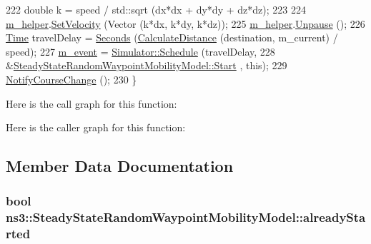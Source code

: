 \begin{DoxyCode}
222   \textcolor{keywordtype}{double} k = speed / std::sqrt (dx*dx + dy*dy + dz*dz);
223 
224   \hyperlink{classns3_1_1SteadyStateRandomWaypointMobilityModel_ac32e974711c22cb50358e4e10109516c}{m\_helper}.\hyperlink{classns3_1_1ConstantVelocityHelper_a985ce86c5b3c94c43048f8db314bbb51}{SetVelocity} (Vector (k*dx, k*dy, k*dz));
225   \hyperlink{classns3_1_1SteadyStateRandomWaypointMobilityModel_ac32e974711c22cb50358e4e10109516c}{m\_helper}.\hyperlink{classns3_1_1ConstantVelocityHelper_a053e3968696019359f50d2b2739f783a}{Unpause} ();
226   \hyperlink{namespacens3_1_1TracedValueCallback_a7ffd3e7c142ffe7c8a1d2db9b8de38ec}{Time} travelDelay = \hyperlink{group__timecivil_ga33c34b816f8ff6628e33d5c8e9713b9e}{Seconds} (\hyperlink{namespacens3_aaae60adf695e280c4882ced6041d1628}{CalculateDistance} (destination, m\_current) / 
      speed);
227   \hyperlink{classns3_1_1SteadyStateRandomWaypointMobilityModel_ae57dec0ef026e81c8d9ad3981394b228}{m\_event} = \hyperlink{classns3_1_1Simulator_a671882c894a08af4a5e91181bf1eec13}{Simulator::Schedule} (travelDelay, 
228                                  &\hyperlink{classns3_1_1SteadyStateRandomWaypointMobilityModel_afb5dffc7e7b3e1d2f66f98c1300ca443}{SteadyStateRandomWaypointMobilityModel::Start}
      , \textcolor{keyword}{this});
229   \hyperlink{classns3_1_1MobilityModel_add1317917ac801284c2467a68f09fbe5}{NotifyCourseChange} ();
230 \}
\end{DoxyCode}


Here is the call graph for this function\+:




Here is the caller graph for this function\+:




\subsection{Member Data Documentation}
\subsubsection[{\texorpdfstring{already\+Started}{alreadyStarted}}]{\setlength{\rightskip}{0pt plus 5cm}bool ns3\+::\+Steady\+State\+Random\+Waypoint\+Mobility\+Model\+::already\+Started\hspace{0.3cm}{\ttfamily [private]}}\hypertarget{classns3_1_1SteadyStateRandomWaypointMobilityModel_ae3f6be410c7eb579aab40908b80c2e32}{}\label{classns3_1_1SteadyStateRandomWaypointMobilityModel_ae3f6be410c7eb579aab40908b80c2e32}


